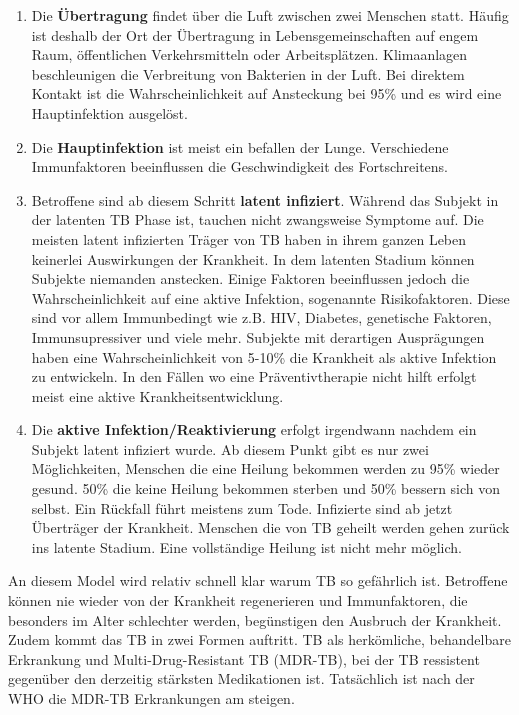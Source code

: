 \documentclass[paper=a4, fontsize=11pt, ngerman, abstract=on]{scrartcl}
\numberwithin{equation}{section} %
\numberwithin{figure}{section} %
\numberwithin{table}{section} %
\begin{document}
\begin{enumerate}
  \item{Die \textbf{Übertragung} findet über die Luft zwischen zwei Menschen statt. Häufig ist deshalb der Ort der Übertragung in Lebensgemeinschaften auf engem Raum, öffentlichen Verkehrsmitteln oder Arbeitsplätzen. Klimaanlagen beschleunigen die Verbreitung von Bakterien in der Luft. Bei direktem Kontakt ist die Wahrscheinlichkeit auf Ansteckung bei 95\% und es wird eine Hauptinfektion ausgelöst.}
  \item{Die \textbf{Hauptinfektion} ist meist ein befallen der Lunge. Verschiedene Immunfaktoren beeinflussen die Geschwindigkeit des Fortschreitens.}
  \item{Betroffene sind ab diesem Schritt \textbf{latent infiziert}. Während das Subjekt in der latenten TB Phase ist, tauchen nicht zwangsweise Symptome auf. Die meisten latent infizierten Träger von TB haben in ihrem ganzen Leben keinerlei Auswirkungen der Krankheit. In dem latenten Stadium können Subjekte niemanden anstecken. Einige Faktoren beeinflussen jedoch die Wahrscheinlichkeit auf eine aktive Infektion, sogenannte Risikofaktoren. Diese sind vor allem Immunbedingt wie z.B. HIV, Diabetes, genetische Faktoren, Immunsupressiver und viele mehr. Subjekte mit derartigen Ausprägungen haben eine Wahrscheinlichkeit von 5-10\% die Krankheit als aktive Infektion zu entwickeln. In den Fällen wo eine Präventivtherapie nicht hilft erfolgt meist eine aktive Krankheitsentwicklung.}
  \item{Die \textbf{aktive Infektion/Reaktivierung} erfolgt irgendwann nachdem ein Subjekt latent infiziert wurde. Ab diesem Punkt gibt es nur zwei Möglichkeiten, Menschen die eine Heilung bekommen werden zu 95\% wieder gesund. 50\% die keine Heilung bekommen sterben und 50\% bessern sich von selbst. Ein Rückfall führt meistens zum Tode. Infizierte sind ab jetzt Überträger der Krankheit. Menschen die von TB geheilt werden gehen zurück ins latente Stadium. Eine vollständige Heilung ist nicht mehr möglich.}
\end{enumerate}

An diesem Model wird relativ schnell klar warum TB so gefährlich ist. Betroffene können nie wieder von der Krankheit regenerieren und Immunfaktoren, die besonders im Alter schlechter werden, begünstigen den Ausbruch der Krankheit. Zudem kommt das TB in zwei Formen auftritt. TB als herkömliche, behandelbare Erkrankung und Multi-Drug-Resistant TB (MDR-TB), bei der TB ressistent gegenüber den derzeitig stärksten Medikationen ist. Tatsächlich ist nach der WHO die MDR-TB Erkrankungen am steigen.
\end{document}
